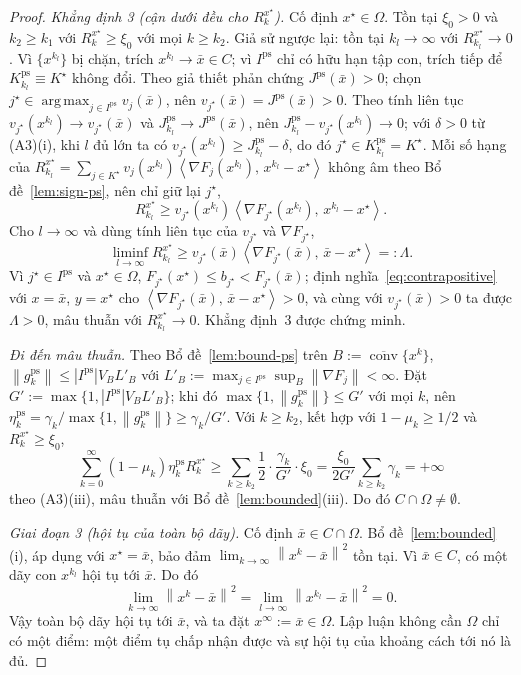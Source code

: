 \documentclass[]{interact}
\theoremstyle{plain}
\theoremstyle{definition}
\theoremstyle{remark}
\newcommand{\norm}[1]{\left\lVert #1 \right\rVert}
\newcommand{\abs}[1]{\left\lvert #1 \right\rvert}
\newcommand{\inner}[2]{\left\langle #1,\, #2 \right\rangle}
\DeclareMathOperator*{\argmax}{arg\,max}
\DeclareMathOperator{\conv}{conv}
\newcommand{\ps}{\mathrm{ps}}
\begin{document}
\begin{proof}
\smallskip
\emph{Khẳng định 3 (cận dưới đều cho $R^{x^\star}_k$).} Cố định $x^\star\in\Omega$. Tồn tại
$\xi_0>0$ và $k_2\ge k_1$ với $R^{x^\star}_k\ge\xi_0$ với mọi $k\ge k_2$. Giả sử
ngược lại: tồn tại $k_l\to\infty$ với $R^{x^\star}_{k_l}\to0$. Vì $\{x^{k_l}\}$ bị chặn,
trích $x^{k_l}\to\bar x\in C$; vì $I^{\ps}$ chỉ có hữu hạn tập con, trích tiếp
để $K^{\ps}_{k_l}\equiv K^\star$ không đổi. Theo giả thiết phản chứng
$J^{\ps}(\bar x)>0$; chọn $j^\star\in\argmax_{j\in I^{\ps}}v_j(\bar x)$, nên
$v_{j^\star}(\bar x)=J^{\ps}(\bar x)>0$. Theo tính liên tục $v_{j^\star}(x^{k_l})\to
v_{j^\star}(\bar x)$ và $J^{\ps}_{k_l}\to J^{\ps}(\bar x)$, nên
$J^{\ps}_{k_l}-v_{j^\star}(x^{k_l})\to0$; với $\delta>0$ từ (A3)(i), khi $l$ đủ lớn ta
có $v_{j^\star}(x^{k_l})\ge J^{\ps}_{k_l}-\delta$, do đó $j^\star\in K^{\ps}_{k_l}=K^\star$.
Mỗi số hạng của
$R^{x^\star}_{k_l}=\sum_{j\in K^\star}v_j(x^{k_l})\inner{\nabla F_j(x^{k_l})}{x^{k_l}-x^\star}$
không âm theo Bổ đề~\ref{lem:sign-ps}, nên chỉ giữ lại $j^\star$,
\[
R^{x^\star}_{k_l}\ge v_{j^\star}(x^{k_l})\inner{\nabla F_{j^\star}(x^{k_l})}{x^{k_l}-x^\star}.
\]
Cho $l\to\infty$ và dùng tính liên tục của $v_{j^\star}$ và $\nabla F_{j^\star}$,
\[
\liminf_{l\to\infty}R^{x^\star}_{k_l}\ge v_{j^\star}(\bar x)\inner{\nabla F_{j^\star}(\bar x)}{\bar x-x^\star}=:\Lambda .
\]
Vì $j^\star\in I^{\ps}$ và $x^\star\in\Omega$, $F_{j^\star}(x^\star)\le b_{j^\star}<F_{j^\star}(\bar x)$;
định nghĩa~\eqref{eq:contrapositive} với $x=\bar x$, $y=x^\star$ cho
$\inner{\nabla F_{j^\star}(\bar x)}{\bar x-x^\star}>0$, và cùng với $v_{j^\star}(\bar x)>0$ ta
được $\Lambda>0$, mâu thuẫn với $R^{x^\star}_{k_l}\to0$. Khẳng định~3 được chứng minh.

\smallskip
\emph{Đi đến mâu thuẫn.} Theo Bổ đề~\ref{lem:bound-ps} trên
$B:=\overline{\conv}\{x^k\}$, $\norm{g^{\ps}_k}\le\abs{I^{\ps}}V_B L'_B$ với
$L'_B:=\max_{j\in I^{\ps}}\sup_B\norm{\nabla F_j}<\infty$. Đặt
$G':=\max\{1,\abs{I^{\ps}}V_B L'_B\}$; khi đó $\max\{1,\norm{g^{\ps}_k}\}\le G'$ với mọi $k$,
nên $\eta^{\ps}_k=\gamma_k/\max\{1,\norm{g^{\ps}_k}\}\ge\gamma_k/G'$. Với $k\ge k_2$,
kết hợp với $1-\mu_k\ge1/2$ và $R^{x^\star}_k\ge\xi_0$,
\[
\sum_{k=0}^\infty(1-\mu_k)\eta^{\ps}_k R^{x^\star}_k\ge\sum_{k\ge k_2}\frac12\cdot\frac{\gamma_k}{G'}\cdot\xi_0=\frac{\xi_0}{2G'}\sum_{k\ge k_2}\gamma_k=+\infty
\]
theo (A3)(iii), mâu thuẫn với Bổ đề~\ref{lem:bounded}(iii). Do đó $C\cap\Omega\ne\emptyset$.

\emph{Giai đoạn 3 (hội tụ của toàn bộ dãy).} Cố định $\bar x\in C\cap\Omega$.
Bổ đề~\ref{lem:bounded}(i), áp dụng với $x^\star=\bar x$, bảo đảm
$\lim_{k\to\infty}\norm{x^k-\bar x}^2$ tồn tại. Vì $\bar x\in C$, có một dãy con
$x^{k_l}$ hội tụ tới $\bar x$. Do đó
\[
\lim_{k\to\infty}\norm{x^k-\bar x}^2
=\lim_{l\to\infty}\norm{x^{k_l}-\bar x}^2=0.
\]
Vậy toàn bộ dãy hội tụ tới $\bar x$, và ta đặt $x^\infty:=\bar x\in\Omega$.
Lập luận không cần $\Omega$ chỉ có một điểm: một điểm tụ chấp nhận được và
sự hội tụ của khoảng cách tới nó là đủ.
\end{proof}
\end{document}
